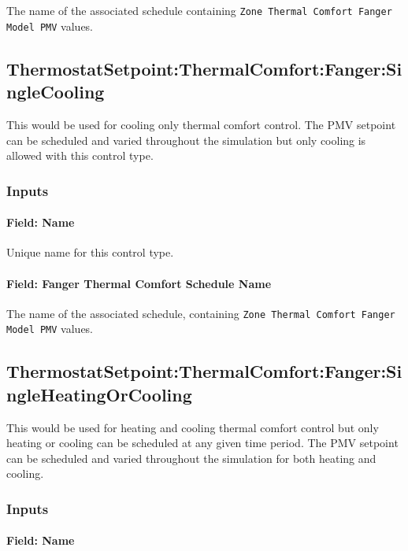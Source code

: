 The name of the associated schedule containing \lstinline!Zone Thermal Comfort Fanger Model PMV! values.

\subsection{ThermostatSetpoint:ThermalComfort:Fanger:SingleCooling}\label{thermostatsetpointthermalcomfortfangersinglecooling}

This would be used for cooling only thermal comfort control. The PMV setpoint can be scheduled and varied throughout the simulation but only cooling is allowed with this control type.

\subsubsection{Inputs}\label{inputs-11-022}

\paragraph{Field: Name}\label{field-name-9-021}

Unique name for this control type.

\paragraph{Field: Fanger Thermal Comfort Schedule Name}\label{field-fanger-thermal-comfort-schedule-name-1}

The name of the associated schedule, containing \lstinline!Zone Thermal Comfort Fanger Model PMV! values.

\subsection{ThermostatSetpoint:ThermalComfort:Fanger:SingleHeatingOrCooling}\label{thermostatsetpointthermalcomfortfangersingleheatingorcooling}

This would be used for heating and cooling thermal comfort control but only heating or cooling can be scheduled at any given time period. The PMV setpoint can be scheduled and varied throughout the simulation for both heating and cooling.

\subsubsection{Inputs}\label{inputs-12-020}

\paragraph{Field: Name}\label{field-name-10-019}

